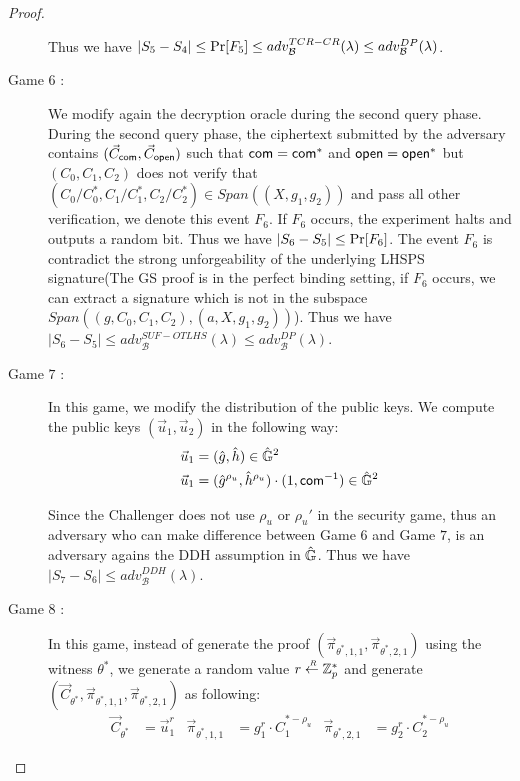 \begin{proof}
\begin{description}
    Thus we have $|S_5 - S_4| \leq \operatorname{Pr}[F_5] \leq adv_{\mathcal{B}}^{TCR-CR}(\lambda) \leq adv_{\mathcal{B}}^{DP}(\lambda)$. 

  \item[\textsf{Game} $6$ :] We modify again the decryption oracle during the second query phase. During the second query phase, the ciphertext submitted by the adversary contains $(\vec{C}_{\mathsf{com}}, \vec{C}_{\mathsf{open}})$ such that $\mathsf{com} = \mathsf{com}^*$ and $\mathsf{open} = \mathsf{open}^*$ but $(C_0, C_1, C_2)$ does not verify that $(C_0/ C_0^*, C_1/C_1^*, C_2/C_2^*) \in Span((X, g_1, g_2))$ and pass all other verification, we denote this event $F_6$. If $F_6$ occurs, the experiment halts and outputs a random bit. Thus we have $|S_6 - S_5| \leq \operatorname{Pr}[F_6]$. The event $F_6$ is contradict the strong unforgeability of the underlying LHSPS signature(The GS proof is in the perfect binding setting, if $F_6$ occurs, we can extract a signature which is not in the subspace $Span((g, C_0, C_1, C_2), (a, X, g_1, g_2))$). Thus we have $|S_6 - S_5| \leq adv_{\mathcal{B}}^{SUF-OTLHS}(\lambda) \leq adv_{\mathcal{B}}^{DP}(\lambda)$.
    
    
  \item[\textsf{Game} $7$ :] In this game, we modify the distribution of the public keys. We compute the public keys $(\vec{u}_1, \vec{u}_2)$ in the following way:
    \begin{align*}
      \vec{u}_1 &= (\hat{g}, \hat{h}) \in \hat{\mathbb{G}}^2\\
      \vec{u}_1 &= (\hat{g}^{\rho_u}, \hat{h}^{\rho_u}) \cdot (1, \mathsf{com}^{-1}) \in \hat{\mathbb{G}}^2
    \end{align*}

    Since the Challenger does not use $\rho_u$ or $\rho_u'$ in the security game, thus an adversary who can make difference between \textsf{Game} $6$ and \textsf{Game} $7$, is an adversary agains the DDH assumption in $\hat{\mathbb{G}}$. Thus we have $|S_7 - S_6| \leq adv_{\mathcal{B}}^{DDH}(\lambda)$.

  \item[\textsf{Game} $8$ :] In this game, instead of generate the proof $(\vec{\pi}_{\theta^*, 1, 1}, \vec{\pi}_{\theta^*, 2, 1})$ using the witness $\theta^*$, we generate a random value $r \stackrel{{\scriptscriptstyle \mkern4mu R}}{\gets} \mathbb{Z}_p^*$ and generate $(\vec{C}_{\theta^*}, \vec{\pi}_{\theta^*,1,1}, \vec{\pi}_{\theta^*,2,1})$ as following:
    \begin{align*}
      \vec{C}_{\theta^*} &= \vec{u}_1^r & \vec{\pi}_{\theta^*,1,1} &= g_1^r \cdot C_1^{*-\rho_u} & \vec{\pi}_{\theta^*,2,1} &= g_2^r \cdot C_2^{*-\rho_u}
    \end{align*}


\end{description}
\end{proof}
